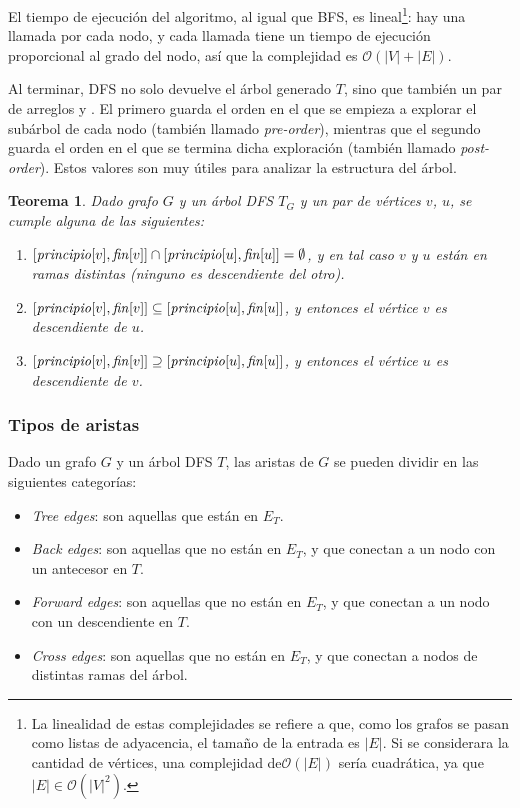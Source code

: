 \documentclass[a4paper]{report}
\newcommand{\BigO}[1]{\ensuremath{\mathcal{O}(#1)}}
\newtheorem*{theorem*}{Teorema}
\begin{document}
El tiempo de ejecución del algoritmo, al igual que BFS, es lineal\footnote{La linealidad de estas complejidades se refiere a que, como los grafos se pasan como listas de adyacencia, el tamaño de la entrada es $|E|$. Si se considerara la cantidad de vértices, una complejidad de\BigO{|E|} sería cuadrática, ya que $|E| \in \BigO{|V|^2}$.}: hay una llamada por cada nodo, y cada llamada tiene un tiempo de ejecución proporcional al grado del nodo, así que la complejidad es $\BigO{|V| + |E|}$.

Al terminar, DFS no solo devuelve el árbol generado $T$, sino que también un par de arreglos  y . El primero guarda el orden en el que se empieza a explorar el subárbol de cada nodo (también llamado \textit{pre-order}), mientras que el segundo guarda el orden en el que se termina dicha exploración (también llamado \textit{post-order}). Estos valores son muy útiles para analizar la estructura del árbol.

\begin{theorem*}
    Dado grafo $G$ y un árbol DFS $T_G$ y un par de vértices $v$, $u$, se cumple alguna de las siguientes:
    \begin{enumerate}
        \item $[\id{principio}[v], \id{fin}[v]] \cap [\id{principio}[u], \id{fin}[u]] = \emptyset$, y en tal caso $v$ y $u$ están en ramas distintas (ninguno es descendiente del otro).
        \item $[\id{principio}[v], \id{fin}[v]] \subseteq [\id{principio}[u], \id{fin}[u]]$, y entonces el vértice $v$ es descendiente de $u$.
        \item $[\id{principio}[v], \id{fin}[v]] \supseteq [\id{principio}[u], \id{fin}[u]]$, y entonces el vértice $u$ es descendiente de $v$.
    \end{enumerate}
\end{theorem*}

\subsubsection{Tipos de aristas}
\label{dfs-edges}

Dado un grafo $G$ y un árbol DFS $T$, las aristas de $G$ se pueden dividir en las siguientes categorías:
\begin{itemize}
    \item \textit{Tree edges}: son aquellas que están en $E_T$.
    \item \textit{Back edges}: son aquellas que no están en $E_T$, y que conectan a un nodo con un antecesor en $T$.
    \item \textit{Forward edges}: son aquellas que no están en $E_T$, y que conectan a un nodo con un descendiente en $T$.
    \item \textit{Cross edges}: son aquellas que no están en $E_T$, y que conectan a nodos de distintas ramas del árbol.
\end{itemize}
\end{document}
